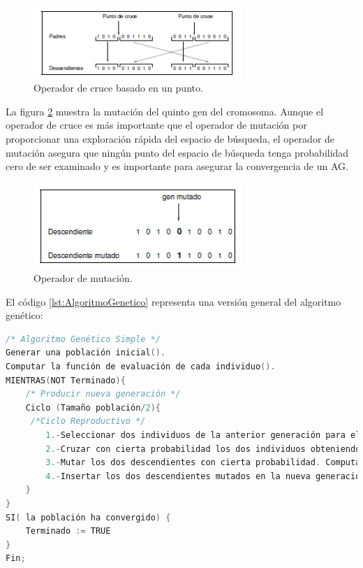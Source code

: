 \begin{figure}[hbtp]
    \centering
        \includegraphics[width=0.7\textwidth]{MarcoTeorico/Imagenes/Codigo-genetico1.png}
        \caption{Operador de cruce basado en un punto.}                       
        \label{fig:Codigo-genetico1}
\end{figure} 
 
\hspace*{1cm}La figura \ref{fig:Codigo-genetico2} muestra la mutación del quinto gen del cromosoma.  Aunque el operador de cruce es más importante que el operador de mutación por proporcionar una exploración rápida del espacio de búsqueda, el operador de mutación asegura que ningún punto del espacio de búsqueda tenga probabilidad cero de ser examinado y es importante para asegurar la convergencia de un AG.

   \begin{figure}[hbtp]
        \centering
            \includegraphics[width=0.7\textwidth]{MarcoTeorico/Imagenes/Codigo-genetico2.png}
            \caption{Operador de mutación.}                       
            \label{fig:Codigo-genetico2}
    \end{figure} 
    
\hspace*{1cm}El código \ref{lst:AlgoritmoGenetico} representa una versión general del algoritmo genético:\\

\begin{lstlisting}[language=C++, caption=Pseudocódigo base para el algoritmo algoritmo genético., label=lst:AlgoritmoGenetico]
/* Algoritmo Genético Simple */
Generar una población inicial().
Computar la función de evaluación de cada individuo().
MIENTRAS(NOT Terminado){
    /* Producir nueva generación */
    Ciclo (Tamaño población/2){
     /*Ciclo Reproductivo */
        1.-Seleccionar dos individuos de la anterior generación para el cruce (probabilidad de selección proporcional a la función de evaluación del individuo);
        2.-Cruzar con cierta probabilidad los dos individuos obteniendo dos descendientes;
        3.-Mutar los dos descendientes con cierta probabilidad. Computar la función de evaluación de los dos descendientes mutados;
        4.-Insertar los dos descendientes mutados en la nueva generación;
    }
}
SI( la población ha convergido) {
    Terminado := TRUE
}
Fin;

\end{lstlisting}
